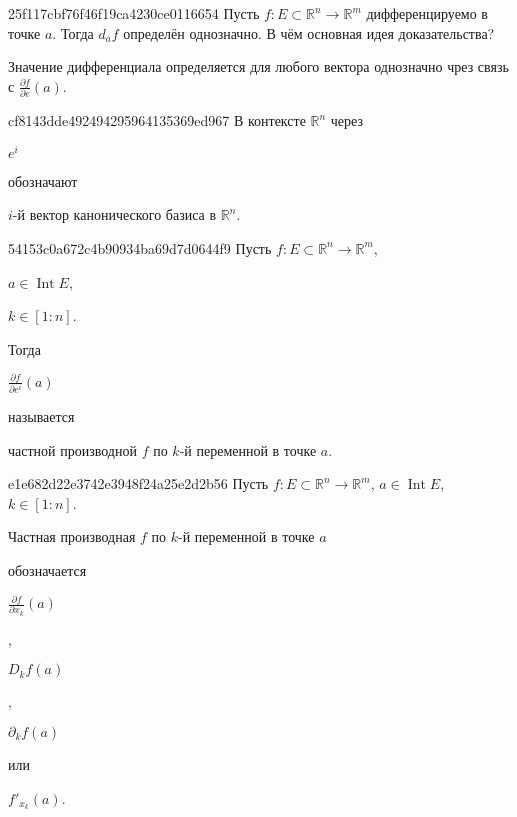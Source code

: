 \begin{note}{25f117cbf76f46f19ca4230ce0116654}
    Пусть \({ f : E \subset \mathbb R^{n} \to \mathbb R^{m} }\) дифференцируемо в точке \({ a }\).
    Тогда \({ d_{a}f }\) определён однозначно.
    В чём основная идея доказательства?

    \begin{cloze}{1}
        Значение дифференциала определяется для любого вектора однозначно чрез связь с \({ \frac{\partial f}{\partial e}(a) }\).
    \end{cloze}
\end{note}

\begin{note}{cf8143dde492494295964135369ed967}
    В контексте \({ \mathbb R^{n} }\) через \begin{icloze}{2}\({ e^{i} }\)\end{icloze} обозначают \begin{icloze}{1}\({ i }\)-й вектор канонического базиса в \({ \mathbb R^{n} }\).\end{icloze}
\end{note}

\begin{note}{54153c0a672c4b90934ba69d7d0644f9}
    Пусть \({ f : E \subset \mathbb R^{n} \to \mathbb R^{m} }\),\: \begin{icloze}{4}\({ a \in \operatorname{Int} E }\),\end{icloze}\: \begin{icloze}{3}\({ k \in [1 : n] }\).\end{icloze}
    Тогда \begin{icloze}{2}\({ \frac{\partial f}{\partial e^{i}}(a) }\)\end{icloze} называется \begin{icloze}{1}частной производной \({ f }\) по \({ k }\)-й переменной в точке \({ a }\).\end{icloze}
\end{note}

\begin{note}{e1e682d22e3742e3948f24a25e2d2b56}
    Пусть \({ f : E \subset \mathbb R^{n} \to \mathbb R^{m} }\),\: \({ a \in \operatorname{Int} E }\),\: \({ k \in [1 : n] }\).
    \begin{icloze}{2}Частная производная \({ f }\) по \({ k }\)-й переменной в точке \({ a }\)\end{icloze} обозначается
    \begin{center}
        \begin{icloze}{1}\({ \frac{\partial f}{\partial x_k}(a) }\)\end{icloze},\: \begin{icloze}{1}\({ D_k f(a) }\)\end{icloze},\: \begin{icloze}{1}\({ \partial_k f(a) }\)\end{icloze} или \begin{icloze}{1}\({ f'_{x_k}(a) }\).\end{icloze}
    \end{center}
\end{note}

